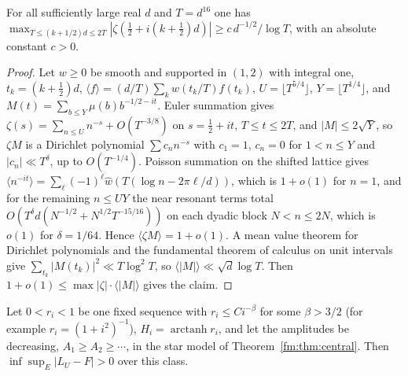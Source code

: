 \begin{lemma}\label{fm:lem:progression}
For all sufficiently large real $d$ and $T=d^{16}$ one has $\max_{T\le(k+1/2)d\le2T}|\zeta(\frac12+i(k+\frac12)d)|\ge c\,d^{-1/2}/\log T$, with an absolute constant $c>0$.
\end{lemma}

\begin{proof}
Let $w\ge0$ be smooth and supported in $(1,2)$ with integral one, $t_k=(k+\frac12)d$, $\langle f\rangle=(d/T)\sum_kw(t_k/T)f(t_k)$, $U=\lfloor T^{5/4}\rfloor$, $Y=\lfloor T^{1/4}\rfloor$, and $M(t)=\sum_{b\le Y}\mu(b)b^{-1/2-it}$. Euler summation gives $\zeta(s)=\sum_{n\le U}n^{-s}+O(T^{-3/8})$ on $s=\frac12+it$, $T\le t\le2T$, and $|M|\le2\sqrt Y$, so $\zeta M$ is a Dirichlet polynomial $\sum c_nn^{-s}$ with $c_1=1$, $c_n=0$ for $1<n\le Y$ and $|c_n|\ll T^\delta$, up to $O(T^{-1/4})$. Poisson summation on the shifted lattice gives $\langle n^{-it}\rangle=\sum_\ell(-1)^\ell\widehat w(T(\log n-2\pi\ell/d))$, which is $1+o(1)$ for $n=1$, and for the remaining $n\le UY$ the near resonant terms total $O(T^{\delta}d(N^{-1/2}+N^{1/2}T^{-15/16}))$ on each dyadic block $N<n\le2N$, which is $o(1)$ for $\delta=1/64$. Hence $\langle\zeta M\rangle=1+o(1)$. A mean value theorem for Dirichlet polynomials and the fundamental theorem of calculus on unit intervals give $\sum_{t_k}|M(t_k)|^2\ll T\log^2T$, so $\langle|M|\rangle\ll\sqrt d\log T$. Then $1+o(1)\le\max|\zeta|\cdot\langle|M|\rangle$ gives the claim.
\end{proof}

\begin{corollary}\label{fm:cor:fixedfields}
Let $0<r_i<1$ be one fixed sequence with $r_i\le Ci^{-\beta}$ for some $\beta>3/2$ (for example $r_i=(1+i^2)^{-1}$), $H_i=\operatorname{arctanh}r_i$, and let the amplitudes be decreasing, $A_1\ge A_2\ge\cdots$, in the star model of Theorem~\ref{fm:thm:central}. Then $\inf\sup_E|L_U-F|>0$ over this class.
\end{corollary}

